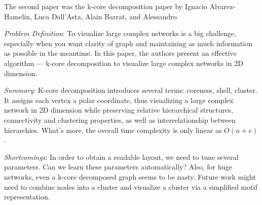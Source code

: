 The second paper was the k-core decomposition paper by Ignacio Alvarez-Hamelin, Luca Dall’Asta, Alain Barrat, and Alessandro
\cite{kcore}
\begin{itemize*}
\item {\em Problem Definition}: To visualize large complex networks is a big challenge, especially when you want clarity of graph and maintaining as much information as possible in the meantime. In this paper, the authors present an effective algorithm — k-core decomposition to visualize large complex networks in 2D dimension.
\item {\em Summary}:
K-core decomposition introduces several terms: coreness, shell, cluster. It assigns each vertex a polar coordinate, thus visualizing a large complex network in 2D dimension while preserving relative hierarchical structures, connectivity and clustering properties, as well as interrelationship between hierarchies. What’s more, the overall time complexity is only linear as $O(n + e)$.
\item{\em Shortcomings}:
In order to obtain a readable layout, we need to tune several parameters. Can we learn these parameters automatically? Also, for huge networks, even a k-core decomposed graph seems to be nasty. Future work might need to combine nodes into a cluster and visualize a cluster via a simplified motif representation.
\end{itemize*}

